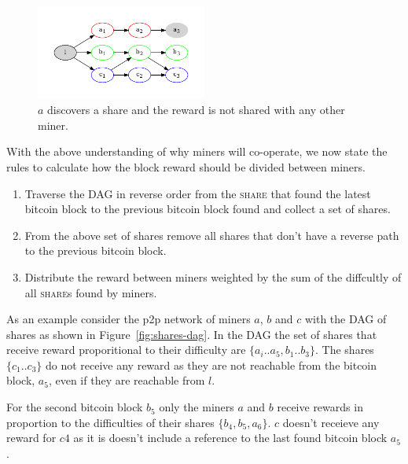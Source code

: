 \documentclass{article}
\begin{document}
\begin{figure}[h]
  \begin{center}
    \includegraphics[width=0.5\textwidth]{isolated-miners}
    \caption{$a$ discovers a share and the reward is not shared with any
      other miner.}\label{fig:isolated-miners}
  \end{center}    
\end{figure}

With the above understanding of why miners will co-operate, we now
state the rules to calculate how the block reward should be divided
between miners.

\begin{enumerate}
  \item Traverse the DAG in reverse order from the \textsc{share} that
    found the latest bitcoin block to the previous bitcoin block found
    and collect a set of shares.
  \item From the above set of shares remove all shares that don't have
    a reverse path to the previous bitcoin block.
  \item Distribute the reward between miners weighted by the sum of
    the diffcultly of all \textsc{share}s found by miners.
\end{enumerate}

As an example consider the p2p network of miners $a$, $b$ and $c$ with
the DAG of shares as shown in Figure~\ref{fig:shares-dag}. In the DAG
the set of shares that receive reward proporitional to their
difficulty are $\{a_i..a_5, b_1..b_3\}$. The shares $\{c_1..c_3\}$ do
not receive any reward as they are not reachable from the bitcoin
block, $a_5$, even if they are reachable from $l$.

For the second bitcoin block $b_5$ only the miners $a$ and $b$ receive
rewards in proportion to the difficulties of their shares $\{b_4, b_5,
a_6\}$. $c$ doesn't receieve any reward for $c4$ as it is doesn't
include a reference to the last found bitcoin block $a_5$.
\end{document}

